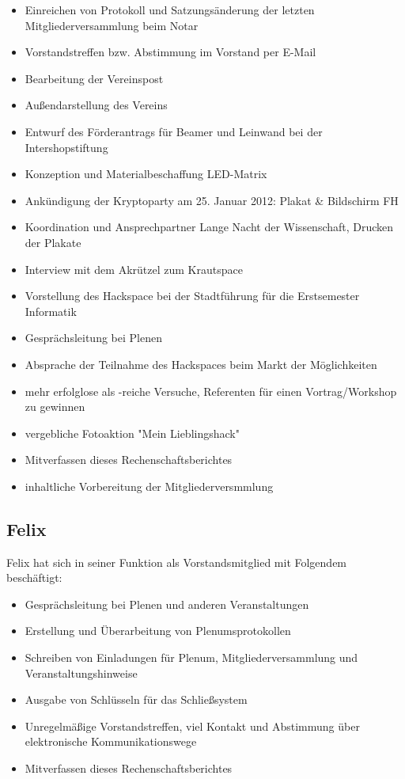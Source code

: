 \documentclass[10pt,DIV16]{scrartcl}
\begin{document}
\begin{itemize}
	\item Einreichen von Protokoll und Satzungsänderung der letzten Mitgliederversammlung beim Notar
    \item Vorstandstreffen bzw. Abstimmung im Vorstand per E-Mail
    \item Bearbeitung der Vereinspost
    \item Außendarstellung des Vereins
	\item Entwurf des Förderantrags für Beamer und Leinwand bei der Intershopstiftung
	\item Konzeption und Materialbeschaffung LED-Matrix
	\item Ankündigung der Kryptoparty am 25. Januar 2012:  Plakat \& Bildschirm FH
	\item Koordination und Ansprechpartner Lange Nacht der Wissenschaft, Drucken der Plakate
	\item Interview mit dem Akrützel zum Krautspace
	\item Vorstellung des Hackspace bei der Stadtführung für die Erstsemester Informatik
    \item Gesprächsleitung bei Plenen
	\item Absprache der Teilnahme des Hackspaces beim Markt der Möglichkeiten
	\item mehr erfolglose als -reiche Versuche, Referenten für einen Vortrag/Workshop zu gewinnen
	\item vergebliche Fotoaktion "Mein Lieblingshack"
    \item Mitverfassen dieses Rechenschaftsberichtes
    \item inhaltliche Vorbereitung der Mitgliederversmmlung
\end{itemize}

\subsection{Felix}

Felix hat sich in seiner Funktion als Vorstandsmitglied mit Folgendem 
beschäftigt:

\begin{itemize}
    \item Gesprächsleitung bei Plenen und anderen Veranstaltungen
    \item Erstellung und Überarbeitung von Plenumsprotokollen
    \item Schreiben von Einladungen für Plenum, Mitgliederversammlung und 
        Veranstaltungshinweise
    \item Ausgabe von Schlüsseln für das Schließsystem
    \item Unregelmäßige Vorstandstreffen, viel Kontakt und Abstimmung über 
        elektronische Kommunikationswege
    \item Mitverfassen dieses Rechenschaftsberichtes
\end{itemize}
\end{document}
